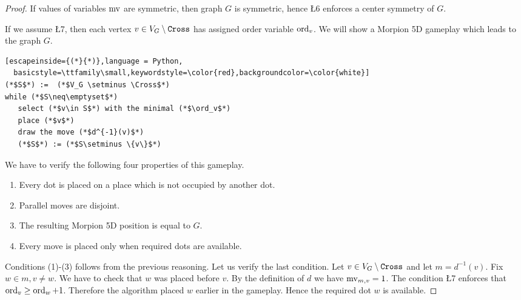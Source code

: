 \begin{proof}
  If values of variables $\operatorname{mv}$ are symmetric, then graph $G$ is symmetric, hence \L{6} enforces a center symmetry of $G$.
  
  If we assume \L{7}, then each vertex $v \in V_G \setminus \texttt{Cross}$ has assigned order variable $\operatorname{ord}_v$. We will show 
a Morpion 5D gameplay which leads to the graph $G$. 
\begin{lstlisting}[escapeinside={(*}{*)},language = Python,
  basicstyle=\ttfamily\small,keywordstyle=\color{red},backgroundcolor=\color{white}]
(*$S$*) :=  (*$V_G \setminus \Cross$*)
while (*$S\neq\emptyset$*)
   select (*$v\in S$*) with the minimal (*$\ord_v$*)
   place (*$v$*)  
   draw the move (*$d^{-1}(v)$*)
   (*$S$*) := (*$S\setminus \{v\}$*) 
\end{lstlisting}
We have to verify the following four properties of this gameplay. 
\begin{enumerate}[label=(\arabic*)]
\item Every dot is placed on a place which is not occupied by another dot.  
\item Parallel moves are disjoint. 
\item The resulting Morpion 5D position is equal to $G$. 
\item Every move is placed only when required dots are available. 
\end{enumerate}
Conditions (1)-(3) follows from the previous reasoning. Let us verify the last condition. Let $v\in V_G \setminus \texttt{Cross}$
and let $m=d^{-1}(v)$. Fix $w \in m, v \neq w$. We have to check that $w$ was placed before $v$.
By the definition of $d$ we have $\operatorname{mv}_{m, v} = 1$. %
The condition \L{7} enforces that $\operatorname{ord}_{v} \geq \operatorname{ord}_w+1$. %
  Therefore the algorithm placed $w$ earlier in the gameplay. Hence the required dot $w$ is available. %
\end{proof}

